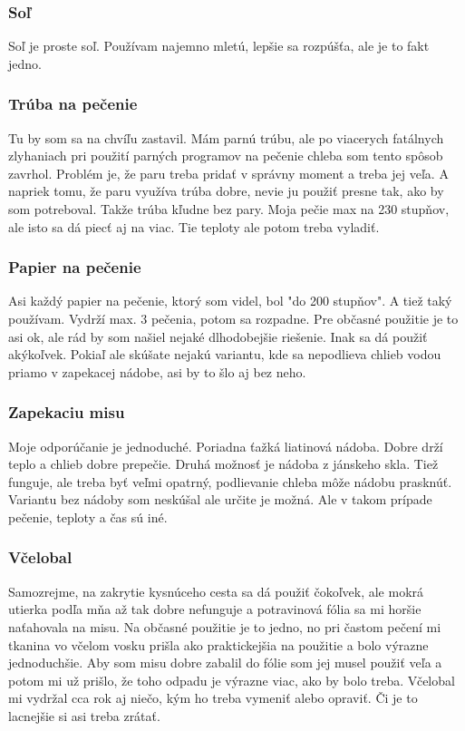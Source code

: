 \documentclass[a4paper,12pt]{article}
\begin{document}
\subsubsection{Soľ}
Soľ je proste soľ. Používam najemno mletú, lepšie sa rozpúšťa, ale je to fakt jedno.
\subsubsection{Trúba na pečenie}
Tu by som sa na chvíľu zastavil. Mám parnú trúbu, ale po viacerych fatálnych zlyhaniach pri použití parných programov na pečenie chleba som tento spôsob zavrhol. Problém je, že paru treba pridať v správny moment a treba jej veľa. A napriek tomu, že paru využíva trúba dobre, nevie ju použiť presne tak, ako by som potreboval. Takže trúba kľudne bez pary. Moja pečie max na 230 stupňov, ale isto sa dá piecť aj na viac. Tie teploty ale potom treba vyladiť.
\subsubsection{Papier na pečenie}
Asi každý papier na pečenie, ktorý som videl, bol "do 200 stupňov". A tiež taký používam. Vydrží max. 3 pečenia, potom sa rozpadne. Pre občasné použitie je to asi ok, ale rád by som našiel nejaké dlhodobejšie riešenie. Inak sa dá použiť akýkoľvek. Pokiaľ ale skúšate nejakú variantu, kde sa nepodlieva chlieb vodou priamo v zapekacej nádobe, asi by to šlo aj bez neho.
\subsubsection{Zapekaciu misu}
Moje odporúčanie je jednoduché. Poriadna ťažká liatinová nádoba. Dobre drží teplo a chlieb dobre prepečie. Druhá možnosť je nádoba z jánskeho skla. Tiež funguje, ale treba byť veľmi opatrný, podlievanie chleba môže nádobu prasknúť. Variantu bez nádoby som neskúšal ale určite je možná. Ale v takom prípade pečenie, teploty a čas sú iné.
\subsubsection{Včelobal}
Samozrejme, na zakrytie kysnúceho cesta sa dá použiť čokoľvek, ale mokrá utierka podľa mňa až tak dobre nefunguje a potravinová fólia sa mi horšie naťahovala na misu. Na občasné použitie je to jedno, no pri častom pečení mi tkanina vo včelom vosku prišla ako praktickejšia na použitie a bolo výrazne jednoduchšie. Aby som misu dobre zabalil do fólie som jej musel použiť veľa a potom mi už prišlo, že toho odpadu je výrazne viac, ako by bolo treba. Včelobal mi vydržal cca rok aj niečo, kým ho treba vymeniť alebo opraviť. Či je to lacnejšie si asi treba zrátať.
\end{document}
